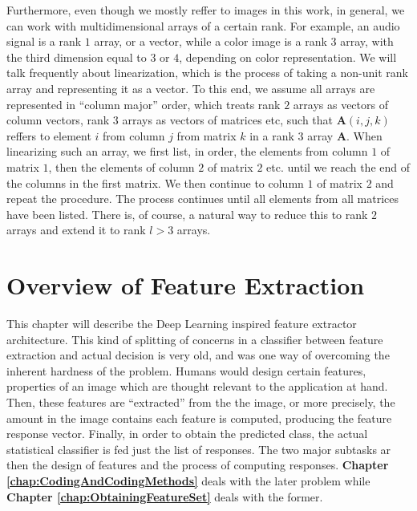 \documentclass[12pt,a4paper,oneside,english]{UPBThesis}
\begin{document}
Furthermore, even though we mostly reffer to images in this work, in general, we can work with multidimensional arrays of a certain rank. For example, an audio signal is a rank $1$ array, or a vector, while a color image is a rank $3$ array, with the third dimension equal to $3$ or $4$, depending on color representation. We will talk frequently about linearization, which is the process of taking a non-unit rank array and representing it as a vector. To this end, we assume all arrays are represented in ``column major'' order, which treats rank $2$ arrays as vectors of column vectors, rank $3$ arrays as vectors of matrices etc, such that $\textbf{A}(i,j,k)$ reffers to element $i$ from column $j$ from matrix $k$ in a rank $3$ array $\textbf{A}$. When linearizing such an array, we first list, in order, the elements from column $1$ of matrix $1$, then the elements of column $2$ of matrix $2$ etc. until we reach the end of the columns in the first matrix. We then continue to column $1$ of matrix $2$ and repeat the procedure. The process continues until all elements from all matrices have been listed. There is, of course, a natural way to reduce this to rank $2$ arrays and extend it to rank $l > 3$ arrays.

\clearpage
\newpage
\thispagestyle{empty}
\mbox{}

\chapter{Overview of Feature Extraction}
\label{chap:OverviewFeatureExtraction}

This chapter will describe the Deep Learning inspired feature extractor architecture. This kind of splitting of concerns in a classifier between feature extraction and actual decision is very old, and was one way of overcoming the inherent hardness of the problem. Humans would design certain features, properties of an image which are thought relevant to the application at hand. Then, these features are ``extracted'' from the the image, or more precisely, the amount in the image contains each feature is computed, producing the feature response vector. Finally, in order to obtain the predicted class, the actual statistical classifier is fed just the list of responses. The two major subtasks ar then the design of features and the process of computing responses. \textbf{Chapter \ref{chap:CodingAndCodingMethods}} deals with the later problem while \textbf{Chapter \ref{chap:ObtainingFeatureSet}} deals with the former.
\end{document}

